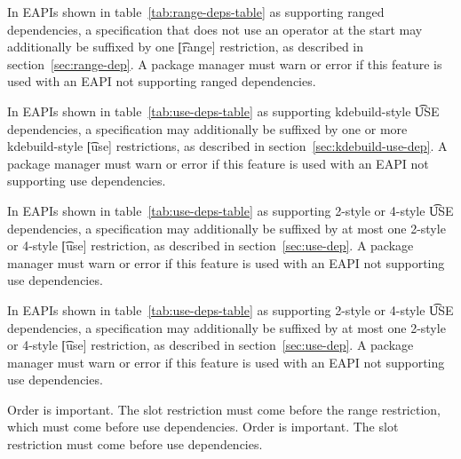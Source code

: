 \IFKDEBUILDELSE
{
    In EAPIs shown in table~\ref{tab:range-deps-table} as supporting ranged dependencies, a
    specification that does not use an operator at the start may additionally be suffixed by one
    \t{[range]} restriction, as described in section~\ref{sec:range-dep}. A package manager must warn or
    error if this feature is used with an EAPI not supporting ranged dependencies.
}{
}

\IFKDEBUILDELSE
{
     In EAPIs shown in table~\ref{tab:use-deps-table} as supporting
    kdebuild-style \t{USE} dependencies, a specification may additionally be suffixed by one or more
    kdebuild-style \t{[use]} restrictions, as described in section~\ref{sec:kdebuild-use-dep}. A
    package manager must warn or error if this feature is used with an EAPI not supporting use
    dependencies.

    In EAPIs shown in table~\ref{tab:use-deps-table} as supporting 2-style or 4-style \t{USE}
    dependencies, a specification may additionally be suffixed by at most one 2-style or 4-style
    \t{[use]} restriction, as described in section~\ref{sec:use-dep}. A package manager must warn or
    error if this feature is used with an EAPI not supporting use dependencies.
}{
     In EAPIs shown in table~\ref{tab:use-deps-table} as supporting 2-style
    or 4-style \t{USE} dependencies, a specification may additionally be suffixed by at most one
    2-style or 4-style \t{[use]} restriction, as described in section~\ref{sec:use-dep}. A package
    manager must warn or error if this feature is used with an EAPI not supporting use dependencies.
}

\IFKDEBUILDELSE
{
    \note Order is important. The slot restriction must come before the range restriction, which
    must come before use dependencies.
}{
    \note Order is important. The slot restriction must come before use dependencies.
}

